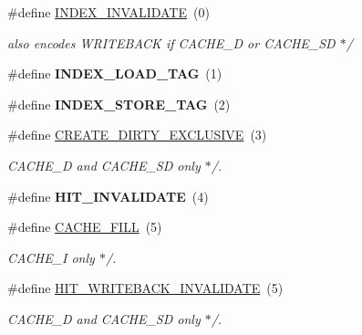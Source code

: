 \begin{DoxyCompactItemize}
\#define \mbox{\hyperlink{group__mips__regs_ga3e91cd07b1e94f7658a7d5547a9118d6}{I\+N\+D\+E\+X\+\_\+\+I\+N\+V\+A\+L\+I\+D\+A\+TE}}~(0)
\begin{DoxyCompactList}\small\item\em also encodes W\+R\+I\+T\+E\+B\+A\+CK if C\+A\+C\+H\+E\+\_\+D or C\+A\+C\+H\+E\+\_\+\+SD $\ast$/ \end{DoxyCompactList}\item 
\mbox{\label{group__mips__regs_ga02453b23292afb16ebe1ddc9c4c8d3aa}} 
\#define {\bfseries I\+N\+D\+E\+X\+\_\+\+L\+O\+A\+D\+\_\+\+T\+AG}~(1)
\item 
\mbox{\label{group__mips__regs_ga17152df13763852ba1484d64910436fc}} 
\#define {\bfseries I\+N\+D\+E\+X\+\_\+\+S\+T\+O\+R\+E\+\_\+\+T\+AG}~(2)
\item 
\mbox{\label{group__mips__regs_ga97907e5b8271912811beab2e8e268613}} 
\#define \mbox{\hyperlink{group__mips__regs_ga97907e5b8271912811beab2e8e268613}{C\+R\+E\+A\+T\+E\+\_\+\+D\+I\+R\+T\+Y\+\_\+\+E\+X\+C\+L\+U\+S\+I\+VE}}~(3)
\begin{DoxyCompactList}\small\item\em C\+A\+C\+H\+E\+\_\+D and C\+A\+C\+H\+E\+\_\+\+SD only $\ast$/. \end{DoxyCompactList}\item 
\mbox{\label{group__mips__regs_ga7beb8e48e54cd213e8a6a96391d8b177}} 
\#define {\bfseries H\+I\+T\+\_\+\+I\+N\+V\+A\+L\+I\+D\+A\+TE}~(4)
\item 
\mbox{\label{group__mips__regs_gae1a9ea4d0a8c76c61375507cd5f31248}} 
\#define \mbox{\hyperlink{group__mips__regs_gae1a9ea4d0a8c76c61375507cd5f31248}{C\+A\+C\+H\+E\+\_\+\+F\+I\+LL}}~(5)
\begin{DoxyCompactList}\small\item\em C\+A\+C\+H\+E\+\_\+I only $\ast$/. \end{DoxyCompactList}\item 
\mbox{\label{group__mips__regs_ga202defacfb0fb83e543baf9e75cb8221}} 
\#define \mbox{\hyperlink{group__mips__regs_ga202defacfb0fb83e543baf9e75cb8221}{H\+I\+T\+\_\+\+W\+R\+I\+T\+E\+B\+A\+C\+K\+\_\+\+I\+N\+V\+A\+L\+I\+D\+A\+TE}}~(5)
\begin{DoxyCompactList}\small\item\em C\+A\+C\+H\+E\+\_\+D and C\+A\+C\+H\+E\+\_\+\+SD only $\ast$/. \end{DoxyCompactList}\item 

\end{DoxyCompactItemize}

